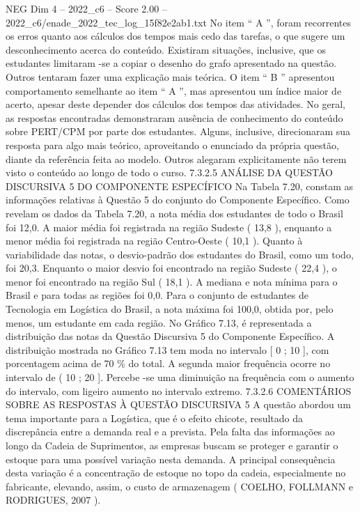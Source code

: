 \begin{textsample}{NEG Dim 4 – 2022\_c6 – Score 2.00 – 2022\_c6/enade\_2022\_tec\_log\_15f82e2ab1.txt}
No item “ A ”, foram recorrentes os erros quanto aos cálculos dos tempos mais cedo das tarefas, o que sugere um desconhecimento acerca do conteúdo.
Existiram situações, inclusive, que os estudantes limitaram -se a copiar o desenho do grafo apresentado na questão.
Outros tentaram fazer uma explicação mais teórica.
O item “ B ” apresentou comportamento semelhante ao item “ A ”, mas apresentou um índice maior de acerto, apesar deste depender dos cálculos dos tempos das atividades.
No geral, as respostas encontradas demonstraram ausência de conhecimento do conteúdo sobre PERT/CPM por parte dos estudantes.
Alguns, inclusive, direcionaram sua resposta para algo mais teórico, aproveitando o enunciado da própria questão, diante da referência feita ao modelo.
Outros alegaram explicitamente não terem visto o conteúdo ao longo de todo o curso. 7.3.2.5 ANÁLISE DA QUESTÃO DISCURSIVA 5 DO COMPONENTE ESPECÍFICO Na Tabela 7.20, constam as informações relativas à Questão 5 do conjunto do Componente Específico.
Como revelam os dados da Tabela 7.20, a nota média dos estudantes de todo o Brasil foi 12,0.
A maior média foi registrada na região Sudeste ( 13,8 ), enquanto a menor média foi registrada na região Centro-Oeste ( 10,1 ).
Quanto à variabilidade das notas, o desvio-padrão dos estudantes do Brasil, como um todo, foi 20,3.
Enquanto o maior desvio foi encontrado na região Sudeste ( 22,4 ), o menor foi encontrado na região Sul ( 18,1 ).
A mediana e nota mínima para o Brasil e para todas as regiões foi 0,0.
Para o conjunto de estudantes de Tecnologia em Logística do Brasil, a nota máxima foi 100,0, obtida por, pelo menos, um estudante em cada região.
No Gráfico 7.13, é representada a distribuição das notas da Questão Discursiva 5 do Componente Específico.
A distribuição mostrada no Gráfico 7.13 tem moda no intervalo [ 0 ; 10 ], com porcentagem acima de 70 \% do total.
A segunda maior frequência ocorre no intervalo de ( 10 ; 20 ].
Percebe -se uma diminuição na frequência com o aumento do intervalo, com ligeiro aumento no intervalo extremo. 7.3.2.6 COMENTÁRIOS SOBRE AS RESPOSTAS À QUESTÃO DISCURSIVA 5 A questão abordou um tema importante para a Logística, que é o efeito chicote, resultado da discrepância entre a demanda real e a prevista.
Pela falta das informações ao longo da Cadeia de Suprimentos, as empresas buscam se proteger e garantir o estoque para uma possível variação nesta demanda.
A principal consequência desta variação é a concentração de estoque no topo da cadeia, especialmente no fabricante, elevando, assim, o custo de armazenagem ( COELHO, FOLLMANN e RODRIGUES, 2007 ).

\end{textsample}
